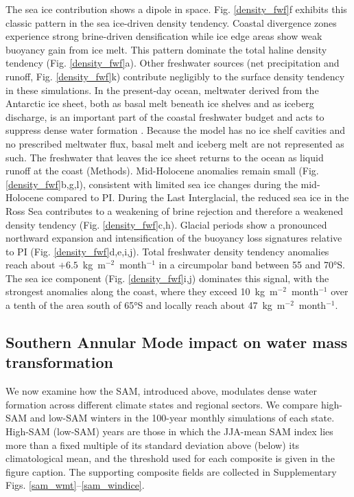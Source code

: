 \documentclass[pdflatex,sn-nature]{sn-jnl}
\begin{document}
The sea ice contribution shows a dipole in space. Fig. \ref{density_fwf}f exhibits this classic pattern in the sea ice-driven density tendency.  Coastal divergence zones experience strong brine-driven densification while ice edge areas show weak buoyancy gain from ice melt. This pattern dominate the total haline density tendency (Fig. \ref{density_fwf}a). Other freshwater sources (net precipitation and runoff, Fig. \ref{density_fwf}k) contribute negligibly to the surface density tendency in these simulations. In the present-day ocean, meltwater derived from the Antarctic ice sheet, both as basal melt beneath ice shelves and as iceberg discharge, is an important part of the coastal freshwater budget and acts to suppress dense water formation \cite{Silvano2018,ToggweilerSamuels1995}. Because the model has no ice shelf cavities and no prescribed meltwater flux, basal melt and iceberg melt are not represented as such. The freshwater that leaves the ice sheet returns to the ocean as liquid runoff at the coast (Methods).
Mid-Holocene anomalies remain small (Fig. \ref{density_fwf}b,g,l), consistent with limited sea ice changes during the mid-Holocene compared to PI. During the Last Interglacial, the reduced sea ice in the Ross Sea contributes to a weakening of brine rejection and therefore a weakened density tendency (Fig. \ref{density_fwf}c,h).
Glacial periods show a pronounced northward expansion and intensification of the buoyancy loss signatures relative to PI (Fig. \ref{density_fwf}d,e,i,j). Total freshwater density tendency anomalies reach about $+6.5$~kg~m$^{-2}$~month$^{-1}$ in a circumpolar band between 55 and 70°S. The sea ice component (Fig. \ref{density_fwf}i,j) dominates this signal, with the strongest anomalies along the coast, where they exceed 10~kg~m$^{-2}$~month$^{-1}$ over a tenth of the area south of 65°S and locally reach about 47~kg~m$^{-2}$~month$^{-1}$.


\subsection{Southern Annular Mode impact on water mass transformation}


We now examine how the SAM, introduced above, modulates dense water formation across different climate states and regional sectors. We compare high-SAM and low-SAM winters in the 100-year monthly simulations of each state. High-SAM (low-SAM) years are those in which the JJA-mean SAM index lies more than a fixed multiple of its standard deviation above (below) its climatological mean, and the threshold used for each composite is given in the figure caption. The supporting composite fields are collected in Supplementary Figs. \ref{sam_wmt}--\ref{sam_windice}.
\end{document}
